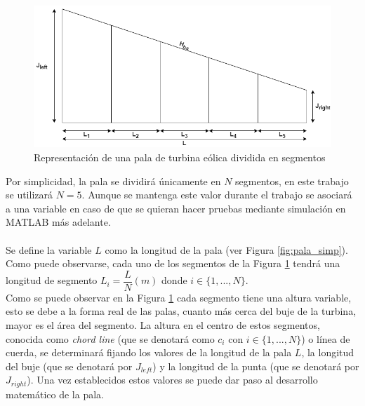 \begin{figure}[H]
    \centering
    \includegraphics[width=1\textwidth]{images/pala simple segmentada.drawio.png}
    \caption{Representación de una pala de turbina eólica dividida en segmentos}
    \label{fig:pala_dividida}
\end{figure}

Por simplicidad, la pala se dividirá únicamente en $N$ segmentos, en este trabajo se utilizará $N=5$. Aunque se mantenga este valor durante el trabajo se asociará a una variable en caso de que se quieran hacer pruebas mediante simulación en MATLAB más adelante. \\\\
    

Se define la variable $L$ como la longitud de la pala (ver Figura \ref{fig:pala_simp}). Como puede observarse, cada uno de los segmentos de la Figura \ref{fig:pala_dividida} tendrá una longitud de segmento $L_i = \dfrac{L}{N} (m)$ donde $i \in \{1,...,N\}$.\\

Como se puede observar en la Figura \ref{fig:pala_dividida} cada segmento tiene una altura variable, esto se debe a la forma real de las palas, cuanto más cerca del buje de la turbina, mayor es el área del segmento. La altura en el centro de estos segmentos, conocida como \textit{chord line} (que se denotará como $c_i$ con $i \in \{1, ...,N\}$) o línea de cuerda, se determinará fijando los valores de la longitud de la pala $L$, la longitud del buje (que se denotará por $J_{left}$) y la longitud de la punta (que se denotará por $J_{right}$). Una vez establecidos estos valores se puede dar paso al desarrollo matemático de la pala.\\

